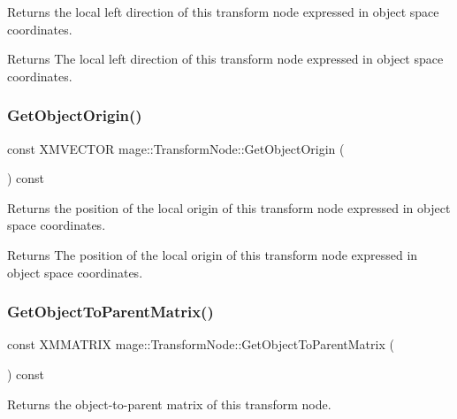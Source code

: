 Returns the local left direction of this transform node expressed in object space coordinates.

\begin{DoxyReturn}{Returns}
The local left direction of this transform node expressed in object space coordinates. 
\end{DoxyReturn}
\hypertarget{classmage_1_1_transform_node_adc1edf6bde3772904073b360f17a65d2}{}\label{classmage_1_1_transform_node_adc1edf6bde3772904073b360f17a65d2} 
\subsubsection{\texorpdfstring{Get\+Object\+Origin()}{GetObjectOrigin()}}
{\footnotesize\ttfamily const X\+M\+V\+E\+C\+T\+OR mage\+::\+Transform\+Node\+::\+Get\+Object\+Origin (\begin{DoxyParamCaption}{ }\end{DoxyParamCaption}) const}

Returns the position of the local origin of this transform node expressed in object space coordinates.

\begin{DoxyReturn}{Returns}
The position of the local origin of this transform node expressed in object space coordinates. 
\end{DoxyReturn}
\hypertarget{classmage_1_1_transform_node_ae70e7e1ba6cf052397113a5ba90d5e98}{}\label{classmage_1_1_transform_node_ae70e7e1ba6cf052397113a5ba90d5e98} 
\subsubsection{\texorpdfstring{Get\+Object\+To\+Parent\+Matrix()}{GetObjectToParentMatrix()}}
{\footnotesize\ttfamily const X\+M\+M\+A\+T\+R\+IX mage\+::\+Transform\+Node\+::\+Get\+Object\+To\+Parent\+Matrix (\begin{DoxyParamCaption}{ }\end{DoxyParamCaption}) const}

Returns the object-\/to-\/parent matrix of this transform node.

